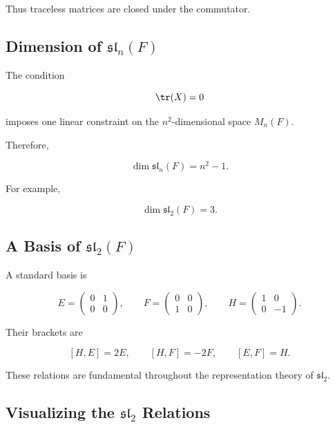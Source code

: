 Thus traceless matrices are closed under the commutator.

\subsection{Dimension of \(\mathfrak{sl}_n(F)\)}
\label{subsec:dimension-sln}

The condition

\[ \tr(X)=0 \]

imposes one linear constraint on the \(n^2\)-dimensional space \(M_n(F)\).

Therefore,

\[ \boxed{\dim\mathfrak{sl}_n(F)=n^2-1.} \]

For example,

\[ \dim\mathfrak{sl}_2(F)=3. \]

\subsection{A Basis of \(\mathfrak{sl}_2(F)\)}
\label{subsec:sl2-basis}

A standard basis is

\[ E=
\begin{pmatrix}
0&1\\
0&0
\end{pmatrix},\qquad
F=
\begin{pmatrix}
0&0\\
1&0
\end{pmatrix},\qquad
H=
\begin{pmatrix}
1&0\\
0&-1
\end{pmatrix}. \]

Their brackets are

\[ [H,E]=2E,\qquad [H,F]=-2F,\qquad [E,F]=H. \]

These relations are fundamental throughout the representation theory of
\(\mathfrak{sl}_2\).

\subsection{Visualizing the \(\mathfrak{sl}_2\) Relations}
\label{subsec:sl2-visual}

